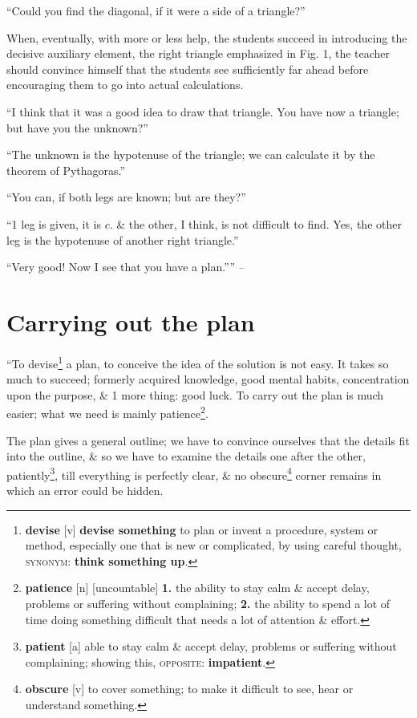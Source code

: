 \documentclass[oneside]{book}
\numberwithin{equation}{section}
\begin{document}
``Could you find the diagonal, if it were a side of a triangle?''

When, eventually, with more or less help, the students succeed in introducing the decisive auxiliary element, the right triangle emphasized in Fig. 1, the teacher should convince himself that the students see sufficiently far ahead before encouraging them to go into actual calculations.

``I think that it was a good idea to draw that triangle. You have now a triangle; but have you the unknown?''

``The unknown is the hypotenuse of the triangle; we can calculate it by the theorem of Pythagoras.''

``You can, if both legs are known; but are they?''

``1 leg is given, it is $c$. \& the other, I think, is not difficult to find. Yes, the other leg is the hypotenuse of another right triangle.''

``Very good! Now I see that you have a plan.'''' -- \cite[pp. 10--12]{Polya2014}

\section{Carrying out the plan}
``To devise\footnote{\textbf{devise} [v] \textbf{devise something} to plan or invent a procedure, system or method, especially one that is new or complicated, by using careful thought, \textsc{synonym}: \textbf{think something up}.} a plan, to conceive the idea of the solution is not easy. It takes so much to succeed; formerly acquired knowledge, good mental habits, concentration upon the purpose, \& 1 more thing: good luck. To carry out the plan is much easier; what we need is mainly patience\footnote{\textbf{patience} [n] [uncountable] \textbf{1.} the ability to stay calm \& accept delay, problems or suffering without complaining; \textbf{2.} the ability to spend a lot of time doing something difficult that needs a lot of attention \& effort.}.

The plan gives a general outline; we have to convince ourselves that the details fit into the outline, \& so we have to examine the details one after the other, patiently\footnote{\textbf{patient} [a] able to stay calm \& accept delay, problems or suffering without complaining; showing this, \textsc{opposite}: \textbf{impatient}.}, till everything is perfectly clear, \& no obscure\footnote{\textbf{obscure} [v] to cover something; to make it difficult to see, hear or understand something.} corner remains in which an error could be hidden.
\end{document}
